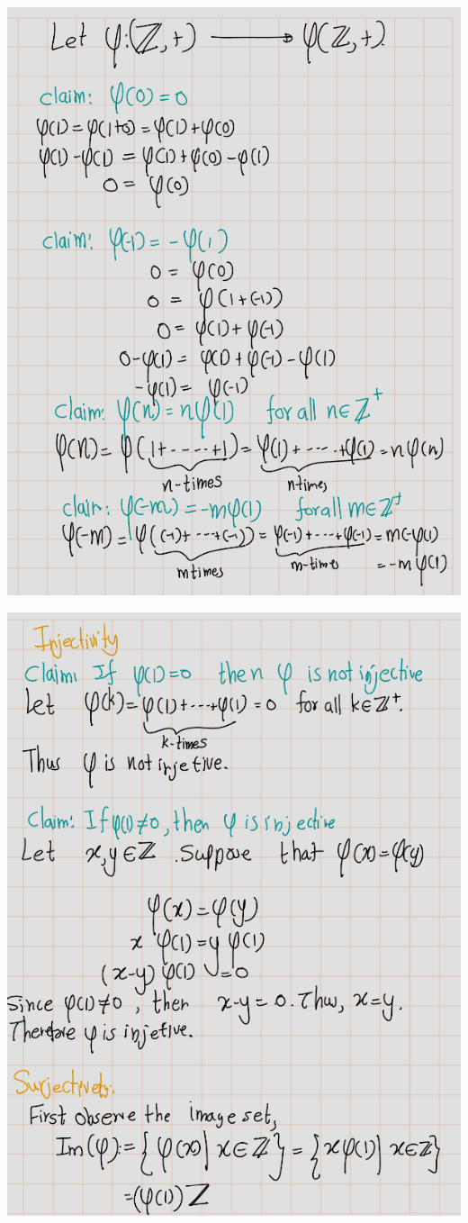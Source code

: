 \documentclass[
]{book}
\theoremstyle{definition}
\theoremstyle{definition}
\theoremstyle{definition}
\theoremstyle{definition}
\theoremstyle{remark}
\begin{document}
\includegraphics{figures/ch_2/fig79.png}

\includegraphics{figures/ch_2/fig80.png}
\end{document}
